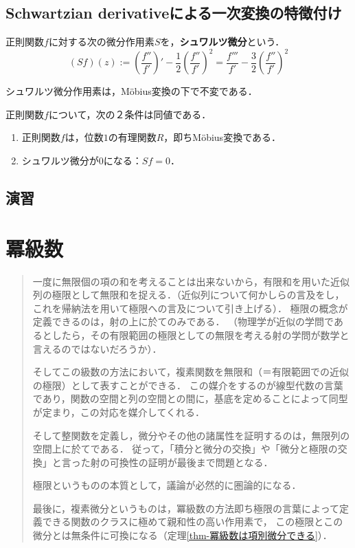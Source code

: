 \documentclass[uplatex, dvipdfmx]{jsreport}
\begin{document}
\section{Schwartzian derivativeによる一次変換の特徴付け}

\begin{definition}
    正則関数$f$に対する次の微分作用素$S$を，\textbf{シュワルツ微分}という．
    \[(Sf)(z):=\left(\frac{f''}{f'}\right)'-\frac{1}{2}\left(\frac{f''}{f'}\right)^2=\frac{f'''}{f'}-\frac{3}{2}\left(\frac{f''}{f'}\right)^2\]
\end{definition}

\begin{proposition}
    シュワルツ微分作用素は，Möbius変換の下で不変である．
\end{proposition}

\begin{proposition}
    正則関数$f$について，次の２条件は同値である．
    \begin{enumerate}
        \item 正則関数$f$は，位数$1$の有理関数$R$，即ちMöbius変換である．
        \item シュワルツ微分が$0$になる：$Sf=0$．
    \end{enumerate}
\end{proposition}

\section{演習}

\chapter{冪級数}

\begin{quotation}
    一度に無限個の項の和を考えることは出来ないから，有限和を用いた近似列の極限として無限和を捉える．（近似列について何かしらの言及をし，これを帰納法を用いて極限への言及について引き上げる）．
    極限の概念が定義できるのは，射の上に於てのみである．
    （物理学が近似の学問であるとしたら，その有限範囲の極限としての無限を考える射の学問が数学と言えるのではないだろうか）．

    そしてこの級数の方法において，複素関数を無限和（＝有限範囲での近似の極限）として表すことができる．
    この媒介をするのが線型代数の言葉であり，関数の空間と列の空間との間に，基底を定めることによって同型が定まり，この対応を媒介してくれる．

    そして整関数を定義し，微分やその他の諸属性を証明するのは，無限列の空間上に於てである．
    従って，「積分と微分の交換」や「微分と極限の交換」と言った射の可換性の証明が最後まで問題となる．

    極限というものの本質として，議論が必然的に圏論的になる．

    最後に，複素微分というものは，冪級数の方法即ち極限の言葉によって定義できる関数のクラスに極めて親和性の高い作用素で，
    この極限とこの微分とは無条件に可換になる（定理\ref{thm-冪級数は項別微分できる}）．
\end{quotation}
\end{document}
